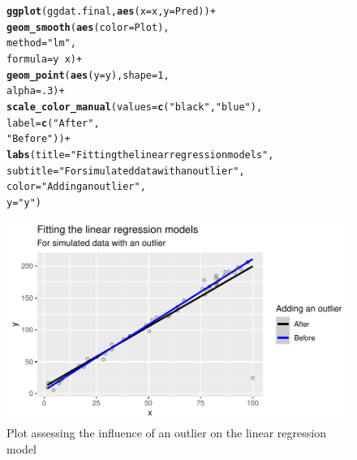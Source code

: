\documentclass{article}\usepackage[]{graphicx}\usepackage[]{color}
\makeatletter
\def\maxwidth{ %
  \ifdim\Gin@nat@width>\linewidth
    \linewidth
  \else
    \Gin@nat@width
  \fi
}
\newcommand{\hlnum}[1]{\textcolor[rgb]{0.686,0.059,0.569}{#1}}%
\newcommand{\hlstr}[1]{\textcolor[rgb]{0.192,0.494,0.8}{#1}}%
\newcommand{\hlopt}[1]{\textcolor[rgb]{0,0,0}{#1}}%
\newcommand{\hlstd}[1]{\textcolor[rgb]{0.345,0.345,0.345}{#1}}%
\newcommand{\hlkwc}[1]{\textcolor[rgb]{0.333,0.667,0.333}{#1}}%
\newcommand{\hlkwd}[1]{\textcolor[rgb]{0.737,0.353,0.396}{\textbf{#1}}}%
\newenvironment{kframe}{%
 \def\at@end@of@kframe{}%
 \ifinner\ifhmode%
  \def\at@end@of@kframe{\end{minipage}}%
  \begin{minipage}{\columnwidth}%
 \fi\fi%
 \def\FrameCommand##1{\hskip\@totalleftmargin \hskip-\fboxsep
 \colorbox{shadecolor}{##1}\hskip-\fboxsep
     \hskip-\linewidth \hskip-\@totalleftmargin \hskip\columnwidth}%
 \MakeFramed {\advance\hsize-\width
   \@totalleftmargin\z@ \linewidth\hsize
   \@setminipage}}%
 {\par\unskip\endMakeFramed%
 \at@end@of@kframe}
\newenvironment{knitrout}{}{} %
\makeatother
\begin{document}
\begin{enumerate}
\begin{enumerate}
\begin{enumerate}
\begin{figure}[H]
\begin{center}
\begin{knitrout}
\color{fgcolor}\begin{kframe}
\begin{alltt}
\hlkwd{ggplot}\hlstd{(ggdat.final,} \hlkwd{aes}\hlstd{(}\hlkwc{x}\hlstd{=x,} \hlkwc{y}\hlstd{=Pred))}\hlopt{+}
  \hlkwd{geom_smooth}\hlstd{(}\hlkwd{aes}\hlstd{(}\hlkwc{color}\hlstd{=Plot),}
              \hlkwc{method}\hlstd{=}\hlstr{"lm"}\hlstd{,}
              \hlkwc{formula}\hlstd{=y}\hlopt{~}\hlstd{x)}\hlopt{+}
  \hlkwd{geom_point}\hlstd{(}\hlkwd{aes}\hlstd{(}\hlkwc{y}\hlstd{=y),} \hlkwc{shape}\hlstd{=}\hlnum{1}\hlstd{,}
             \hlkwc{alpha}\hlstd{=}\hlnum{.3}\hlstd{)}\hlopt{+}
  \hlkwd{scale_color_manual}\hlstd{(}\hlkwc{values}\hlstd{=}\hlkwd{c}\hlstd{(}\hlstr{"black"}\hlstd{,} \hlstr{"blue"}\hlstd{),}
                     \hlkwc{label}\hlstd{=}\hlkwd{c}\hlstd{(}\hlstr{"After"}\hlstd{,}
                             \hlstr{"Before"}\hlstd{))}\hlopt{+}
  \hlkwd{labs}\hlstd{(}\hlkwc{title}\hlstd{=}\hlstr{"Fitting the linear regression models"}\hlstd{,}
       \hlkwc{subtitle}\hlstd{=}\hlstr{"For simulated data with an outlier"}\hlstd{,}
       \hlkwc{color}\hlstd{=}\hlstr{"Adding an outlier"}\hlstd{,}
       \hlkwc{y}\hlstd{=}\hlstr{"y"}\hlstd{)}
\end{alltt}
\end{kframe}
\includegraphics[width=\maxwidth]{figure/p4plot4-1} 
\end{knitrout}
\caption{Plot assessing the influence of an outlier on the linear regression model}
\label{p4plot4}
\end{center}
\end{figure}


\end{enumerate}
\end{enumerate}
\end{enumerate}
\end{document}
